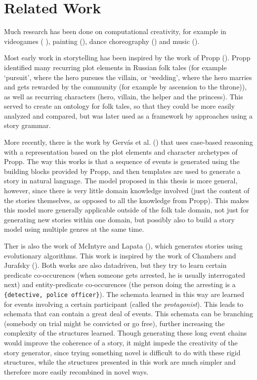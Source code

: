 \section{Related Work}

Much research has been done on computational creativity, for example in
videogames (\cite{liapis2014computational} \cite{crawford1998computer}), painting
(\cite{colton2015painting}), dance choreography (\cite{carlson2011scuddle}) and
music (\cite{johnson2014musical}).

Most early work in storytelling has been inspired by the work of Propp
(\cite{propp1968morphology}). Propp identified many recurring plot elements in
Russian folk tales (for example `pursuit', where the hero pursues the villain, or
`wedding', where the hero marries and gets rewarded by the community (for example
by ascension to the throne)), as well as recurring characters (hero, villain,
the helper and the princess). This served to create an ontology for folk tales,
so that they could be more easily analyzed and compared, but was later used as a
framework by approaches using a story grammar.

More recently, there
is the work by Gerv\'as et al. (\cite{Gervas2005235}) that uses case-based
reasoning with a representation based on the plot elements and character
archetypes of Propp. The way this works is that a sequence of events is generated using the
building blocks provided by Propp, and then templates are used to generate a
story in natural language.
The model proposed in this thesis is more general, however, since there is very
little domain knowledge involved (just the content of the stories themselves, as
opposed to all the knowledge from Propp).
This makes this model more generally applicable outside of the folk tale domain,
not just for generating new stories within one domain, but possibly also to
build a story model using multiple genres at the same time.

Ther is also the work of McIntyre and Lapata (\cite{McIntyre2010}), which
generates stories using evolutionary algorithms. This work is inspired by the
work of Chambers and Jurafsky (\cite{chambers2009unsupervised}). Both works are
also datadriven, but they try to learn certain predicate co-occurences (when someone
gets arrested, he is usually interrogated next) and entity-predicate
co-occurences (the person doing the arresting is a \texttt{\{detective, police
officer\}}). The schemata learned in this way are learned for events involving a
certain participant (called the \emph{protagonist}). This leads to schemata that
can contain a great deal of events. This schemata can be branching (somebody on trial
might be convicted or go free), further increasing the complexity of the
structures learned.
Though generating these long event chains would improve the coherence of a story, 
it might impede the creativity of the story generator, since trying something novel is
difficult to do with these rigid structures, while the structures presented in
this work are much simpler and therefore more easily recombined in novel ways.

